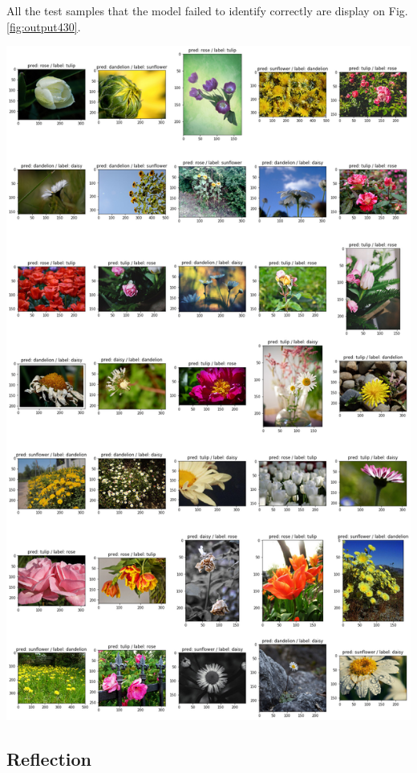 All the test samples that the model failed to identify correctly are display on Fig. \ref{fig:output430}.

\begin{center}
	\includegraphics[scale=.35]{sections/05_conclusion/output_43_0}
	\label{fig:output430}
\end{center}


\subsection{Reflection}

